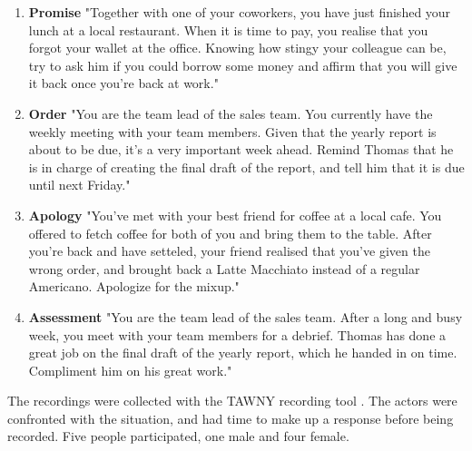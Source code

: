 \begin{enumerate}
    \item \textbf{Promise} "Together with one of your coworkers, you have just finished your lunch at a local restaurant. When it is time to pay, you realise that you forgot your wallet at the office. Knowing how stingy your colleague can be, try to ask him if you could borrow some money and affirm that you will give it back once you’re back at work."
    \item \textbf{Order} "You are the team lead of the sales team. You currently have the weekly meeting with your team members. Given that the yearly report is about to be due, it’s a very important week ahead. Remind Thomas that he is in charge of creating the final draft of the report, and tell him that it is due until next Friday."
    \item \textbf{Apology} "You’ve met with your best friend for coffee at a local cafe. You offered to fetch coffee for both of you and bring them to the table. After you’re back and have setteled, your friend realised that you’ve given the wrong order, and brought back a Latte Macchiato instead of a regular Americano. Apologize for the mixup."
    \item \textbf{Assessment} "You are the team lead of the sales team. After a long and busy week, you meet with your team members for a debrief. Thomas has done a great job on the final draft of the yearly report, which he handed in on time. Compliment him on his great work."
\end{enumerate}

The recordings were collected with the TAWNY recording tool \cite{tawny2021}. The actors were confronted with the situation, and had time to make up a response before being recorded. Five people participated, one male and four female.